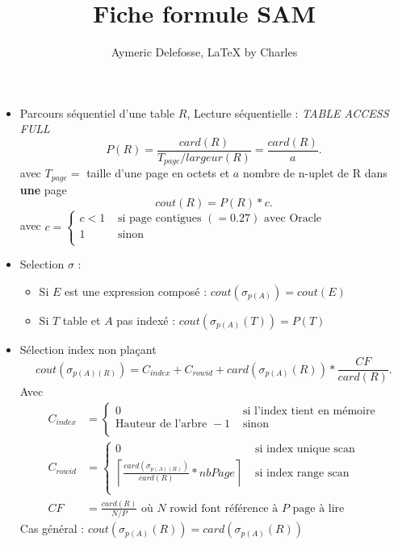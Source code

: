 \documentclass{article}
\title{Fiche formule SAM}
\author{Aymeric Delefosse, LaTeX by Charles}
\theoremstyle{plain}%
\theoremstyle{definition}
\theoremstyle{remark}
\begin{document}
\maketitle
\begin{itemize}
    \item Parcours séquentiel d'une table $ R $, Lecture séquentielle : \textit{TABLE ACCESS FULL} 
    \[
        P(R) = \frac{card(R)}{T_{page} / largeur(R)} = \frac{card(R)}{a}
    .\]
    avec $ T_{page} = $ taille d'une page en octets et $ a $ nombre de n-uplet de R dans \textbf{une} page
    \[
        cout(R) = P(R) * c
    .\]
    avec $ c = \begin{cases}
    c < 1  &\text{ si page contigues } (= 0.27) \text{ avec Oracle}\\
    1 &\text{ sinon }\\
    \end{cases}  $ 
    \item Selection $ \sigma  $ : \begin{itemize}
        \item Si $ E $ est une expression composé : $ cout(\sigma _{p(A)}) = cout(E) $
        \item Si $ T $ table et $ A $ pas indexé : $ cout(\sigma _{p(A)}(T)) = P(T) $ 
    \end{itemize}
    \item Sélection index non plaçant 
    \[
        cout(\sigma _{p(A)(R)}) = C_{index} + C_{rowid} + card(\sigma _{p(A)}(R)) * \frac{CF}{card(R)}
    .\]
    Avec \begin{align*}
        C_{index} &= \begin{cases}
        0 &\text{ si l'index tient en mémoire}\\
        \text{Hauteur de l'arbre } - 1 &\text{ sinon}\\
        \end{cases} \\
        C_{rowid} &= \begin{cases}
        0 &\text{ si index unique scan} \\
        \left\lceil \frac{card(\sigma _{p(A)(R)})}{card(R)} * nbPage \right\rceil &\text{ si index range scan}\\
        \end{cases} \\
        CF &= \frac{card(R)}{N/P} \text{ où } N \text{ rowid font référence à } P \text{ page à lire}
    \end{align*}
    Cas général : $ cout(\sigma _{p(A)}(R)) = card(\sigma _{p(A)}(R)) $ 

\end{itemize}
\end{document}
